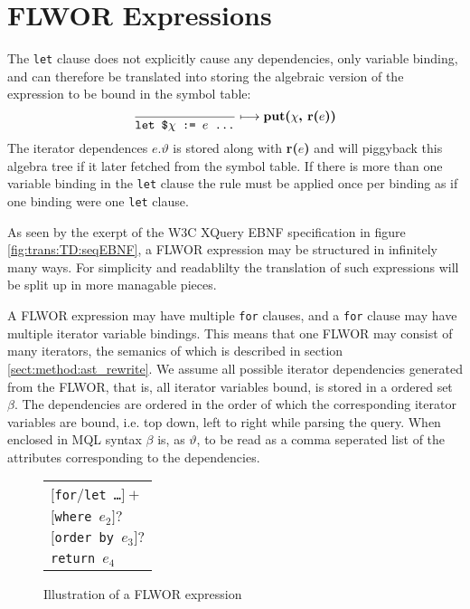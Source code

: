 \section{FLWOR Expressions}
\label{sect:trans:TD:simpleFLWOR}
The \texttt{let} clause does not explicitly cause any dependencies, only variable binding, and can therefore be
translated into storing the algebraic version of the expression to be bound in the symbol table:
\begin{equation}
\frac{}{\mbox{\texttt{let \$}}\chi \mbox{\texttt{ := }}e \mbox{\texttt{ \ldots}}}\longmapsto
\mbox{\textbf{put(}}\chi\mbox{\textbf{, r(}}e\mbox{\textbf{))}}
\label{rule:trans:TD:letbind}
\end{equation}
The iterator dependences $e.\vartheta$ is stored along with \textbf{r(}$e$\textbf{)} and will piggyback this
algebra tree if it later fetched from the symbol table. If there is more than one variable binding in the
\texttt{let} clause the rule must be applied once per binding as if one binding were one \texttt{let} clause.

As seen by the exerpt of the W3C XQuery EBNF specification in figure \ref{fig:trans:TD:seqEBNF}, a FLWOR
expression may be structured in infinitely many ways. For simplicity and readablilty the translation of such
expressions will be split up in more managable pieces. 

A FLWOR expression may have multiple \texttt{for} clauses, and a \texttt{for} clause may have multiple iterator
variable bindings. This means that one FLWOR may consist of many iterators, the semanics of which is described in
section \ref{sect:method:ast_rewrite}. We assume all possible iterator dependencies generated from the FLWOR, that
is, all iterator variables bound, is stored in a ordered set $\beta$. The dependencies are ordered in the order of
which the corresponding iterator variables are bound, i.e. top down, left to right while parsing the query. When
enclosed in MQL syntax $\beta$ is, as $\vartheta$, to be read as a comma seperated list of the attributes
corresponding to the dependencies.

\begin{figure}[h]
\centering
\begin{tabular}{l}
$[$\texttt{for}/\texttt{let \ldots}$]+$ \\ \quad
$[$\texttt{where }$e_2]?$ \\ \quad
$[$\texttt{order by }$e_3]?$ \\
\texttt{return }$e_4$
\end{tabular}
\label{fig:trans:TD:flworIll}
\caption{Illustration of a FLWOR expression}
\end{figure}

